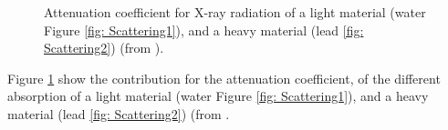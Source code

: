 \begin{figure}[]
%
\centering
%
\quad
%
%
\caption{Attenuation coefficient for X-ray radiation of a light material (water Figure \ref{fig: Scattering1}), and a heavy material (lead \ref{fig: Scattering2}) (from \cite{article_res_geat}).}
\label{fig :AttenuationCoefficient}
%
\end{figure}
Figure \ref{fig :AttenuationCoefficient} show the contribution for the attenuation coefficient, of the different absorption of a light material (water Figure \ref{fig: Scattering1}), and a heavy material (lead \ref{fig: Scattering2}) (from \cite{article_res_geat}.
